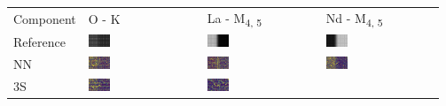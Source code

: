 \begin{tabular}{m{}*{3}{M{0.21\textwidth}}}
Component&O - K&La - M\textsubscript{4, 5}&Nd - M\textsubscript{4, 5}\\
Reference
&\includegraphics[width=0.2\textwidth]{img/chapitre4/figure15/synth/Synth_GT_band_0.png}
&\includegraphics[width=0.2\textwidth]{img/chapitre4/figure15/synth/Synth_GT_band_1.png}
&\includegraphics[width=0.2\textwidth]{img/chapitre4/figure15/synth/Synth_GT_band_2.png}
\\
NN
&\includegraphics[width=0.2\textwidth]{img/chapitre4/figure15/synth/Synth_interpolation_band_0.png}
&\includegraphics[width=0.2\textwidth]{img/chapitre4/figure15/synth/Synth_interpolation_band_1.png}
&\includegraphics[width=0.2\textwidth]{img/chapitre4/figure15/synth/Synth_interpolation_band_2.png}
\\
3S
&\includegraphics[width=0.2\textwidth]{img/chapitre4/figure15/synth/Synth_3S_band_0.png}
&\includegraphics[width=0.2\textwidth]{img/chapitre4/figure15/synth/Synth_3S_band_1.png}

\end{tabular}
